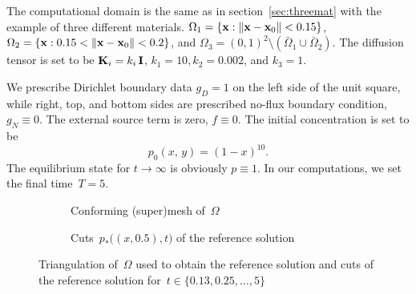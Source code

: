 
The computational domain is the same as in section~\ref{sec:threemat} with the example of three different materials.  $\Omega_1 = \{{\bf x} : \|{\bf x} - {\bf x}_0\| < 0.15\}$, $\Omega_2 = \{{\bf x} : 0.15 < \|{\bf x} - {\bf x}_0\| < 0.2\}$, and $\Omega_3 = (0,1)^2 \setminus (\bar{\Omega}_1\cup\bar{\Omega}_2)$. The diffusion tensor is set to be $\boldsymbol{\mathbf{K}}_i = k_i\,\boldsymbol{\mathbf{I}}$, $k_1 = 10, k_2 = 0.002$, and $k_3 = 1$.
	
We prescribe Dirichlet boundary data $g_D = 1$ on the left side of the unit square, while right, top, and bottom sides are prescribed no-flux boundary condition, $g_N \equiv 0$. The external source term is zero, $f \equiv 0$. The initial concentration is set to be
\begin{equation*}
	p_0(x,\,y) = (1 - x)^{10}.	
\end{equation*}
The equilibrium state for $t\to\infty$ is obviously $p \equiv 1$. In our computations, we set the final time~$T = 5$.
	
\begin{figure}[h]
	\centering
	\begin{subfigure}{.4\linewidth}
		\centering
		\caption{Conforming (super)mesh of~$\Omega$}
	\end{subfigure}%
	\hfill
	\begin{subfigure}{.58\linewidth}
		\centering
		\caption{Cuts~$p_*\big((x,0.5), t\big)$ of the reference solution}	
	\end{subfigure}%
	\caption{Triangulation of~$\Omega$ used to obtain the reference solution and cuts of the reference solution for~$t \in \{0.13, 0.25, \dots, 5\}$ \label{fig:transient:ref}}
\end{figure}

